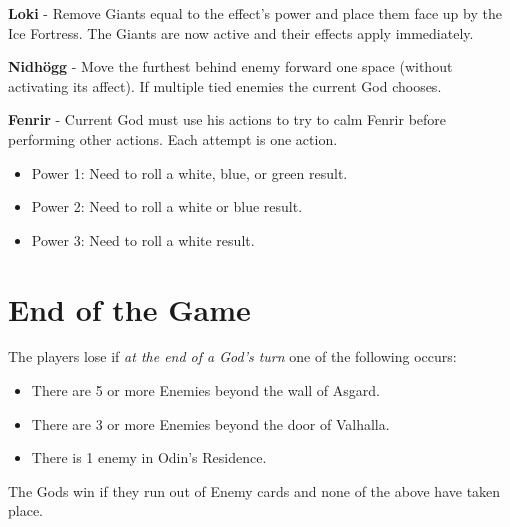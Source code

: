 \documentclass[12pt]{article}
\newenvironment{itemizeCustom}
{\begin{itemize}
  \setlength{\itemsep}{1pt}
  \setlength{\parskip}{0pt}
  \setlength{\parsep}{0pt}}
{\end{itemize}}
\begin{document}
\begin{multicols*}{2}
\noindent
\textbf{Loki} - Remove Giants equal to the effect's power and place them face up by the Ice Fortress. The Giants are now active and their effects apply immediately.

\noindent
\textbf{Nidh\"ogg} - Move the furthest behind enemy forward one space (without activating its affect). If multiple tied enemies the current God chooses.

\noindent
\textbf{Fenrir} - Current God must use his actions to try to calm Fenrir before performing other actions. Each attempt is one action.

\begin{itemizeCustom}
	\item Power 1: Need to roll a white, blue, or green result.
	\item Power 2: Need to roll a white or blue result.
	\item Power 3: Need to roll a white result.
\end{itemizeCustom}

\section*{End of the Game}
The players lose if \emph{at the end of a God's turn} one of the following occurs:
\begin{itemizeCustom}
	\item There are 5 or more Enemies beyond the wall of Asgard.
	\item There are 3 or more Enemies beyond the door of Valhalla.
	\item There is 1 enemy in Odin's Residence.
\end{itemizeCustom}

\noindent
The Gods win if they run out of Enemy cards and none of the above have taken place.

\end{multicols*}
\end{document}

